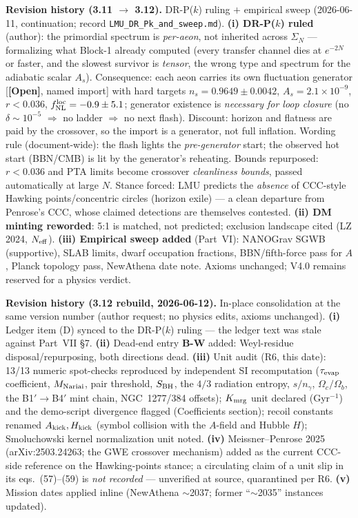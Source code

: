 \documentclass[11pt]{article}
\newcommand{\open}{\textcolor{red!70!black}{\textbf{[Open]}}}
\begin{document}
{\noindent\textbf{Revision history (3.11 $\to$ 3.12).} DR-P($k$) ruling $+$ empirical sweep (2026-06-11, continuation; record \texttt{LMU\_DR\_Pk\_and\_sweep.md}). \textbf{(i) DR-P($k$) ruled} (author): the primordial spectrum is \emph{per-aeon}, not inherited across $\Sigma_N$ --- formalizing what Block-1 already computed (every transfer channel dies at $e^{-2N}$ or faster, and the slowest survivor is \emph{tensor}, the wrong type and spectrum for the adiabatic scalar $A_s$). Consequence: each aeon carries its own fluctuation generator [\open, named import] with hard targets $n_s=0.9649\pm0.0042$, $A_s=2.1\times10^{-9}$, $r<0.036$, $f_{\rm NL}^{\rm loc}=-0.9\pm5.1$; generator existence is \emph{necessary for loop closure} (no $\delta\sim10^{-5}$ $\Rightarrow$ no ladder $\Rightarrow$ no next flash). Discount: horizon and flatness are paid by the crossover, so the import is a generator, not full inflation. Wording rule (document-wide): the flash lights the \emph{pre-generator} start; the observed hot start (BBN/CMB) is lit by the generator's reheating. Bounds repurposed: $r<0.036$ and PTA limits become crossover \emph{cleanliness bounds}, passed automatically at large $N$. Stance forced: LMU predicts the \emph{absence} of CCC-style Hawking points/concentric circles (horizon exile) --- a clean departure from Penrose's CCC, whose claimed detections are themselves contested. \textbf{(ii) DM minting reworded}: 5:1 is matched, not predicted; exclusion landscape cited (LZ 2024, $N_{\rm eff}$). \textbf{(iii) Empirical sweep added} (Part~VI): NANOGrav SGWB (supportive), SLAB limits, dwarf occupation fractions, BBN/fifth-force pass for $A$, Planck topology pass, NewAthena date note. Axioms unchanged; V4.0 remains reserved for a physics verdict.

\noindent\textbf{Revision history (3.12 rebuild, 2026-06-12).} In-place consolidation at the same version number (author request; no physics edits, axioms unchanged). \textbf{(i)} Ledger item (D) synced to the DR-P($k$) ruling --- the ledger text was stale against Part~VII \S7. \textbf{(ii)} Dead-end entry \textbf{B-W} added: Weyl-residue disposal/repurposing, both directions dead. \textbf{(iii)} Unit audit (R6, this date): 13/13 numeric spot-checks reproduced by independent SI recomputation ($\tau_{\rm evap}$ coefficient, $M_{\rm Nariai}$, pair threshold, $S_{\rm BH}$, the $4/3$ radiation entropy, $s/n_\gamma$, $\Omega_c/\Omega_b$, the B1$'\!\to$B4$'$ mint chain, NGC~1277/384 offsets); $K_{\rm mrg}$ unit declared (Gyr$^{-1}$) and the demo-script divergence flagged (Coefficients section); recoil constants renamed $A_{\rm kick},H_{\rm kick}$ (symbol collision with the $A$-field and Hubble $H$); Smoluchowski kernel normalization unit noted. \textbf{(iv)} Meissner--Penrose 2025 (arXiv:2503.24263; the GWE crossover mechanism) added as the current CCC-side reference on the Hawking-points stance; a circulating claim of a unit slip in its eqs.~(57)--(59) is \emph{not recorded} --- unverified at source, quarantined per R6. \textbf{(v)} Mission dates applied inline (NewAthena $\sim$2037; former ``$\sim$2035'' instances updated).

}
\end{document}
